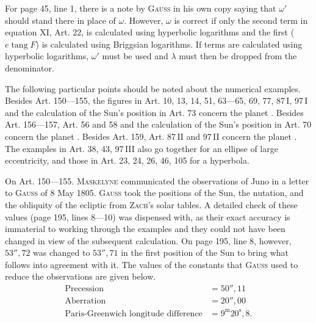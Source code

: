 \hypertarget{native-291-remarks}{}
For page 45, line 1, there is a note by \textsc{Gauss} in his own copy saying that
$\omega'$ should stand there in place of $\omega$. However, $\omega$ is correct if
only the second term in equation XI, Art. 22, is calculated using hyperbolic logarithms
and the first ($e\operatorname{tang} F$) is calculated using Briggsian logarithms.
If  terms are calculated using hyperbolic logarithms, $\omega'$ must
be used and $\lambda$ must then be dropped from the denominator.

The following particular points should be noted about the numerical examples. Besides
Art. 150---155, the figures in Art. 10, 13, 14, 51, 63---65, 69, 77, 87\,I, 97\,I and
the calculation of the Sun's position in Art. 73 concern the planet .
Besides Art. 156---157, Art. 56 and 58 and the calculation of the Sun's position in
Art. 70 concern the planet . Besides Art. 159, Art. 87\,II and 97\,II
concern the planet . The examples in Art. 38, 43, 97\,III also go
together for an ellipse of large eccentricity, and those in Art. 23, 24, 26, 46, 105
for a hyperbola.

On Art. 150---155. \textsc{Maskelyne} communicated the observations of Juno in a letter
to \textsc{Gauss} of 8 May 1805. \textsc{Gauss} took the positions of the Sun, the
nutation, and the obliquity of the ecliptic from \textsc{Zach}'s solar tables. A
detailed check of these values (page 195, lines 8---10) was dispensed with, as their
exact accuracy is immaterial to working through the examples and they could not have
been changed in view of the subsequent calculation. On page 195, line 8, however,
$53''{,}72$ was changed to $53''{,}71$ in the first position of the Sun to bring what
follows into agreement with it. The values of the constants that \textsc{Gauss} used
to reduce the observations are given below.
\[
\begin{aligned}
\text{Precession}&=50''{,}11\\
\text{Aberration}&=20''{,}00\\
\text{Paris-Greenwich longitude difference}&=9^{\mathrm m}20^{\mathrm s}{,}8.
\end{aligned}
\]

